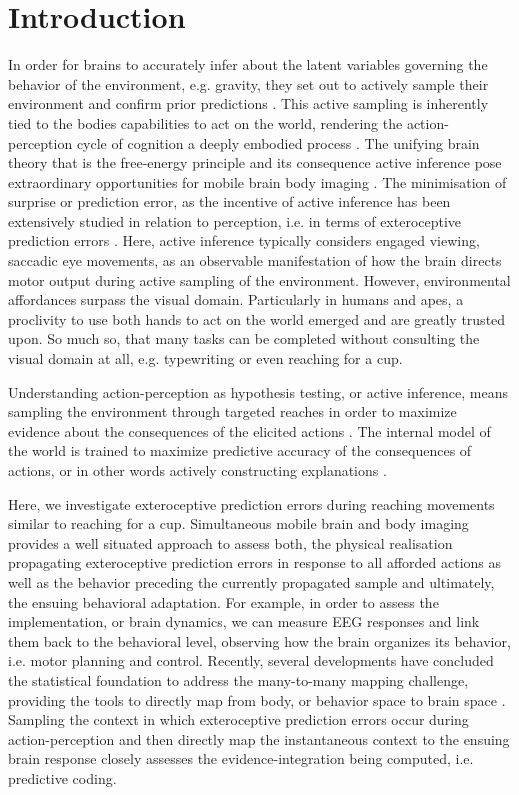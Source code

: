 \section{Introduction}
In order for brains to accurately infer about the latent variables governing the behavior of the environment, e.g. gravity, they set out to actively sample their environment and confirm prior predictions \cites{friston, gregory1989}. This active sampling is inherently tied to the bodies capabilities to act on the world, rendering the action-perception cycle of cognition a deeply embodied process \cite{Friston2012}. The unifying brain theory that is the free-energy principle and its consequence active inference pose extraordinary opportunities for mobile brain body imaging \cites{gramann, makeig}. The minimisation of surprise or prediction error, as the incentive of active inference has been extensively studied in relation to perception, i.e. in terms of exteroceptive prediction errors \cites{cohen, cavahang, mmn_stuff}. Here, active inference typically considers engaged viewing, saccadic eye movements, as an observable manifestation of how the brain directs motor output during active sampling of the environment. However, environmental affordances surpass the visual domain. Particularly in humans and apes, a proclivity to use both hands to act on the world emerged and are greatly trusted upon. So much so, that many tasks can be completed without consulting the visual domain at all, e.g. typewriting or even reaching for a cup. 

Understanding action-perception as hypothesis testing, or active inference, means sampling the environment through targeted reaches in order to maximize evidence about the consequences of the elicited actions \cite{gregory1980}. The internal model of the world is trained to maximize predictive accuracy of the consequences of actions, or in other words actively constructing explanations \cite{friston2018}.

Here, we investigate exteroceptive prediction errors during reaching movements similar to reaching for a cup. Simultaneous mobile brain and body imaging provides a well situated approach to assess both, the physical realisation propagating exteroceptive prediction errors in response to all afforded actions as well as the behavior preceding the currently propagated sample and ultimately, the ensuing behavioral adaptation. For example, in order to assess the implementation, or brain dynamics, we can measure EEG responses and link them back to the behavioral level, observing how the brain organizes its behavior, i.e. motor planning and control. Recently, several developments have concluded the statistical foundation to address the many-to-many mapping challenge, providing the tools to directly map from body, or behavior space to brain space \cites{pernet2011, cohen2011, cavanagh2018, pernet, friston, cavanagh, calhoun, ehinger, dimigen, kutas, groppe}. Sampling the context in which exteroceptive prediction errors occur during action-perception and then directly map the instantaneous context to the ensuing brain response closely assesses the evidence-integration being computed, i.e. predictive coding.

